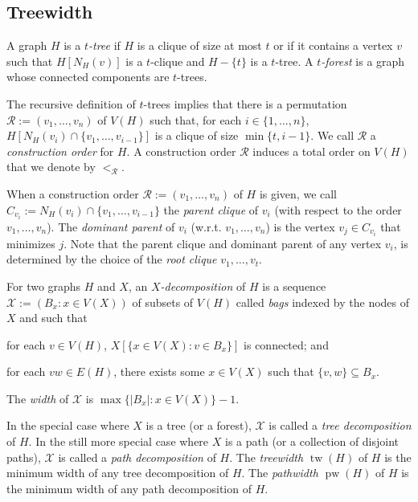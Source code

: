\documentclass[kpfonts]{patmorin}
\DeclareMathOperator{\tw}{tw}
\DeclareMathOperator{\pw}{pw}
\theoremstyle{named}
\begin{document}
\subsection{Treewidth}

A graph $H$ is a \emph{$t$-tree} if $H$ is a clique of size at most $t$ or if it contains a vertex $v$ such that $H[N_H(v)]$ is a $t$-clique and $H-\{t\}$ is a $t$-tree.  A \emph{$t$-forest} is a graph whose connected components are $t$-trees.

The recursive definition of $t$-trees implies that there is a permutation $\mathcal{R}:=(v_1,\ldots,v_n)$ of $V(H)$ such that, for each $i\in\{1,\ldots,n\}$, $H[N_H(v_i)\cap \{v_1,\ldots,v_{i-1}\}]$ is a clique of size $\min\{t,i-1\}$.  We call $\mathcal{R}$ a \emph{construction order} for $H$.  A construction order $\mathcal{R}$ induces a total order on $V(H)$ that we denote by $<_{\mathcal{R}}$.

When a construction order $\mathcal{R}:=(v_1,\ldots,v_n)$ of $H$ is given, we call $C_{v_i}:=N_H(v_i)\cap \{v_1,\ldots,v_{i-1}\}$ the \emph{parent clique} of $v_i$ (with respect to the order $v_1,\ldots,v_n$).  The \emph{dominant parent} of $v_i$ (w.r.t. $v_1,\ldots,v_n$) is the vertex $v_j\in C_{v_i}$ that minimizes $j$. Note that the parent clique and dominant parent of any vertex $v_i$, is determined by the choice of the \emph{root clique} $v_1,\ldots,v_{t}$.

For two graphs $H$ and $X$, an \emph{$X$-decomposition} of $H$ is a sequence $\mathcal{X}:=(B_x:x\in V(X))$ of subsets of $V(H)$ called \emph{bags} indexed by the nodes of $X$ and such that
 \begin{inparaenum}[(i)]
     \item for each $v\in V(H)$, $X[\{x\in V(X):v\in B_x\}]$ is connected; and
     \item for each $vw\in E(H)$, there exists some $x\in V(X)$ such that $\{v,w\}\subseteq B_x$.
\end{inparaenum}
The \emph{width} of $\mathcal{X}$ is $\max\{|B_x|:x\in V(X)\}-1$.

In the special case where $X$ is a tree (or a forest), $\mathcal{X}$ is called a \emph{tree decomposition} of $H$.  In the still more special case where $X$ is a path (or a collection of disjoint paths), $\mathcal{X}$ is called a \emph{path decomposition} of $H$. The \emph{treewidth} $\tw(H)$ of $H$ is the minimum width of any tree decomposition of $H$. The \emph{pathwidth} $\pw(H)$ of $H$ is the minimum width of any path decomposition of $H$.
\end{document}
